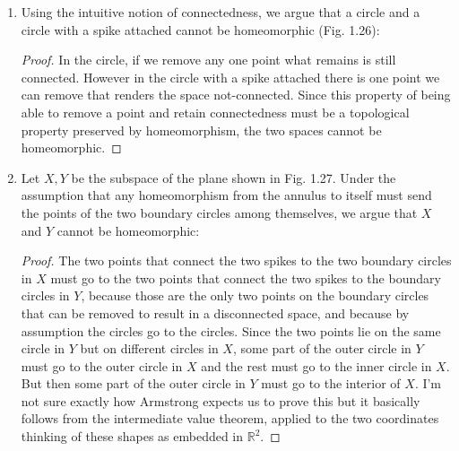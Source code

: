 \documentclass{book}
\begin{document}
\begin{enumerate}
    \item  Using the intuitive notion of connectedness, we argue that a circle and a circle with a spike attached cannot be homeomorphic (Fig. 1.26):
        \begin{proof}  In the circle, if we remove any one point what remains is still connected.  However in the circle with a spike attached there is one point we can remove that renders the space not-connected.  Since this property of being able to remove a point and retain connectedness must be a topological property preserved by homeomorphism, the two spaces cannot be homeomorphic.
        \end{proof}

    \item Let $X,Y$ be the subspace of the plane shown in Fig. 1.27.  Under the assumption that any homeomorphism from the annulus to itself must send the points of the two boundary circles among themselves, we argue that $X$ and $Y$ cannot be homeomorphic:
        \begin{proof} The two points that connect the two spikes to the two boundary circles in $X$ must go to the two points that connect the two spikes to the boundary circles in $Y$, because those are the only two points on the boundary circles that can be removed to result in a disconnected space, and because by assumption the circles go to the circles.  Since the two points lie on the same circle in $Y$ but on different circles in $X$, some part of the outer circle in $Y$ must go to the outer circle in $X$ and the rest must go to the inner circle in $X$.  But then some part of the outer circle in $Y$ must go to the interior of $X$. I'm not sure exactly how Armstrong expects us to prove this but it basically follows from the intermediate value theorem, applied to the two coordinates thinking of these shapes as embedded in $\mathbb R^2$. 
        \end{proof}


\end{enumerate}
\end{document}
